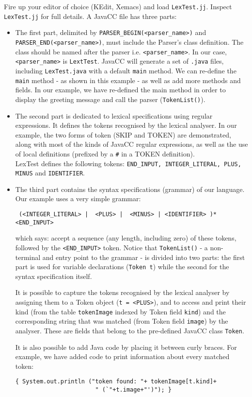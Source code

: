 \documentclass{article}
\begin{document}
Fire up your editor of choice (KEdit, Xemacs) and load \verb+LexTest.jj+. 
Inspect \verb+LexTest.jj+ for full details. A JavaCC file has three parts:
\begin{itemize}
\item The first part, delimited by \verb+PARSER_BEGIN(<parser_name>)+ and \verb+PARSER_END(<parser_name>)+, must include the Parser's class definition. The class should be named after the parser i.e. \verb+<parser_name>+. In our case, \verb+<parser_name>+ is \verb+LextTest+. JavaCC will generate a set of \verb+.java+ files, including \verb+LexTest.java+ with a default \verb+main+ method. We can re-define the \verb+main+ method - as shown in this example - as well as add more methods and fields. In our example, we have re-defined the main method in order to display the greeting message and call the parser (\verb+TokenList()+).
\item The second part is dedicated to lexical specifications using regular expressions. It defines the tokens recognised by the lexical analyser. In our example, the two forms of token (SKIP and TOKEN) are demonstrated, along with most of the kinds of JavaCC regular expressions, as well as the use of local definitions (prefixed by a \verb+#+ in a TOKEN definition).\\
LexTest defines the following tokens: \verb+END_INPUT, INTEGER_LITERAL, PLUS, MINUS+ and \verb+IDENTIFIER+.
\item The third part contains the syntax specifications (grammar) of our language. Our example uses a very simple grammar:
\begin{verbatim}
 (<INTEGER_LITERAL> |  <PLUS> |  <MINUS> | <IDENTIFIER> )* <END_INPUT>
\end{verbatim}
which says: accept a sequence (any length, including zero) of these tokens, followed by the \verb+<END_INPUT>+ token. Notice that \verb+TokenList()+ - a non-terminal and entry point to the grammar - is divided into two parts: the first part is used for variable declarations (\verb+Token t+) while the second for the syntax specification itself.

It is possible to capture the tokens recognised by the lexical analyser by assigning them to  a Token object (\verb+t = <PLUS>+), and  to access and print their kind (from the table \verb+tokenImage+ indexed by Token field \verb+kind+) and the corresponding string that was matched (from Token field \verb+image+) by the analyser. These are fields that belong to the pre-defined JavaCC class \verb+Token+.

It is also possible to add Java code by placing it between curly braces. For example, we have added code to print information about every matched token:
\begin{verbatim}
{ System.out.println ("token found: "+ tokenImage[t.kind]+
                       " (`"+t.image+"')"); }
\end{verbatim} 
\end{itemize}
\end{document}
